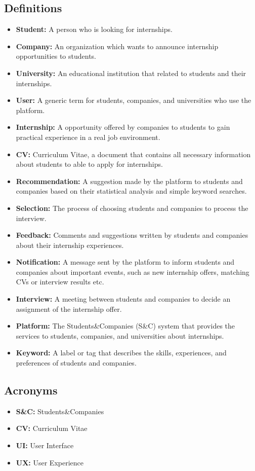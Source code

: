 \subsection{Definitions}
\label{subsec:definitions}
\begin{itemize}
    \item \textbf{Student:} A person who is looking for internships.
    \item \textbf{Company:} An organization which wants to announce internship opportunities to students.
    \item \textbf{University:} An educational institution that related to students and their internships.
    \item \textbf{User:} A generic term for students, companies, and universities who use the platform.
    \item \textbf{Internship:} A opportunity offered by companies to students to gain practical experience in a real job environment.
    \item \textbf{CV:} Curriculum Vitae, a document that contains all necessary information about students to able to apply for internships.
    \item \textbf{Recommendation:} A suggestion made by the platform to students and companies based on their statistical analysis and simple 
    keyword searches.
    \item \textbf{Selection:} The process of choosing students and companies to process the interview.
    \item \textbf{Feedback:} Comments and suggestions written by students and companies about their internship experiences.
    \item \textbf{Notification:} A message sent by the platform to inform students and companies about important events, such as new internship 
    offers, matching CVs or interview results etc.
    \item \textbf{Interview:} A meeting between students and companies to decide an assignment of the internship offer.
    \item \textbf{Platform:} The Students\&Companies (S\&C) system that provides the services to students, companies, and universities about
    internships.
    \item \textbf{Keyword:} A label or tag that describes the skills, experiences, and preferences of students and companies.

\end{itemize}

\subsection{Acronyms}
\label{subsec:acronyms}
\begin{itemize}
    \item \textbf{S\&C:} Students\&Companies
    \item \textbf{CV:} Curriculum Vitae
    \item \textbf{UI:} User Interface
    \item \textbf{UX:} User Experience
\end{itemize}

